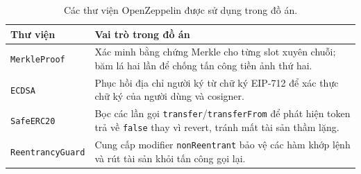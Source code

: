 \documentclass[../DoAn.tex]{subfiles}
\begin{document}
\begin{table}[H]
    \centering
    \caption{Các thư viện OpenZeppelin được sử dụng trong đồ án.}
    \label{table:oz_libs}
    \begin{tabular}{|l|p{9.5cm}|}
        \hline
        \textbf{Thư viện} & \textbf{Vai trò trong đồ án} \\
        \hline
        \texttt{MerkleProof} & Xác minh bằng chứng Merkle cho từng slot xuyên chuỗi; băm lá hai lần để chống tấn công tiền ảnh thứ hai. \\
        \hline
        \texttt{ECDSA} & Phục hồi địa chỉ người ký từ chữ ký EIP-712 để xác thực chữ ký của người dùng và cosigner. \\
        \hline
        \texttt{SafeERC20} & Bọc các lần gọi \texttt{transfer}/\texttt{transferFrom} để phát hiện token trả về \texttt{false} thay vì revert, tránh mất tài sản thầm lặng. \\
        \hline
        \texttt{ReentrancyGuard} & Cung cấp modifier \texttt{nonReentrant} bảo vệ các hàm khớp lệnh và rút tài sản khỏi tấn công gọi lại. \\
        \hline
    \end{tabular}
\end{table}
\end{document}
